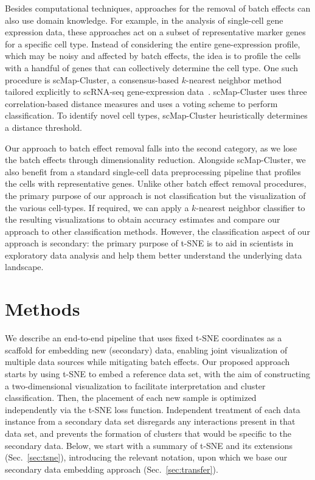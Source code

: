 \documentclass[runningheads]{llncs}
\begin{document}
Besides computational techniques, approaches for the removal of batch effects
can also use domain knowledge. For example, in the analysis of single-cell
gene expression data, these approaches act on a subset of representative
marker genes for a specific cell type. Instead of considering the entire
gene-expression profile, which may be noisy and affected by batch effects,
the idea is to profile the cells with a handful of genes that can
collectively determine the cell type. One such procedure is scMap-Cluster, a
consensus-based $k$-nearest neighbor method tailored explicitly to scRNA-seq
gene-expression data~\cite{Kiselev2018}. scMap-Cluster uses three
correlation-based distance measures and uses a voting scheme to perform
classification. To identify novel cell types, scMap-Cluster heuristically
determines a distance threshold.

Our approach to batch effect removal falls into the second category, as we
lose the batch effects through dimensionality reduction. Alongside
scMap-Cluster, we also benefit from a standard single-cell data preprocessing
pipeline that profiles the cells with representative genes. Unlike other
batch effect removal procedures, the primary purpose of our approach is not
classification but the visualization of the various cell-types. If required,
we can apply a $k$-nearest neighbor classifier to the resulting
visualizations to obtain accuracy estimates and compare our approach to other
classification methods. However, the classification aspect of our approach is
secondary: the primary purpose of t-SNE is to aid in scientists in
exploratory data analysis and help them better understand the underlying data
landscape.

\section{Methods}

We describe an end-to-end pipeline that uses fixed t-SNE coordinates as a
scaffold for embedding new (secondary) data, enabling joint visualization of
multiple data sources while mitigating batch effects. Our proposed approach
starts by using t\nobreakdash -SNE to embed a reference data set, with the aim
of constructing a two-dimensional visualization to facilitate interpretation
and cluster classification. Then, the placement of each new sample is optimized
independently via the t\nobreakdash -SNE loss function. Independent treatment
of each data instance from a secondary data set disregards any interactions
present in that data set, and prevents the formation of clusters that would be
specific to the secondary data. Below, we start with a summary of t-SNE and its
extensions (Sec.~\ref{sec:tsne}), introducing the relevant notation, upon which
we base our secondary data embedding approach (Sec.~\ref{sec:transfer}).
\end{document}
